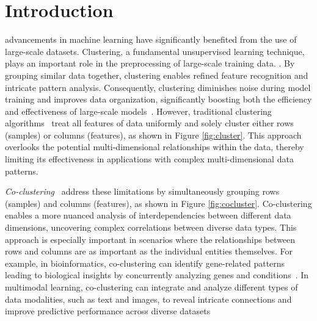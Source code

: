 \documentclass[journal]{IEEEtran}
\renewcommand{\cite}[1]{~\autocite{#1}}
\begin{document}
\section{Introduction}
 advancements in machine learning have significantly benefited from the use of large-scale datasets. Clustering, a fundamental unsupervised learning technique, plays an important role in the preprocessing of large-scale training data. . By grouping similar data together, clustering enables refined feature recognition and intricate pattern analysis. Consequently, clustering diminishes noise during model training and improves data organization, significantly boosting both the efficiency and effectiveness of large-scale models\cite{raskutti2002CombiningClusteringCotraining, li2014ClusteringguidedSparseStructural, ghimatgar2018ImprovedFeatureSelection, li2023DistributedClusteringCooperative, bertsimas2020InterpretableClusteringOptimization}. However, traditional clustering algorithms\cite{} treat all features of data uniformly and solely cluster either rows (samples) or columns (features), as shown in Figure \ref{fig:cluster}. This approach overlooks the potential multi-dimensional relationships within the data, thereby limiting its effectiveness in applications with complex multi-dimensional data patterns.

\textit{Co-clustering}\cite{cheng2000BiclusteringExpressionData, kluger2003SpectralBiclusteringMicroarray, yan2017CoclusteringMultidimensionalBig} address these limitations by simultaneously grouping rows (samples) and columns (features), as shown in Figure \ref{fig:cocluster}. Co-clustering enables a more nuanced analysis of interdependencies between different data dimensions, uncovering complex correlations between diverse data types. This approach is especially important in scenarios where the relationships between rows and columns are as important as the individual entities themselves. For example, in bioinformatics, co-clustering can identify gene-related patterns leading to biological insights by concurrently analyzing genes and conditions\cite{higham2007SpectralClusteringIts, kluger2003SpectralBiclusteringMicroarray, madeira2004BiclusteringAlgorithmsBiological, zhao2012BiclusteringAnalysisPattern, golchev2015BiclusteringAnalysisGene}. 
In multimodal learning, co-clustering can integrate and analyze different types of data modalities, such as text and images, to reveal intricate connections and improve predictive performance across diverse datasets\cite{} 
 
\end{document}
